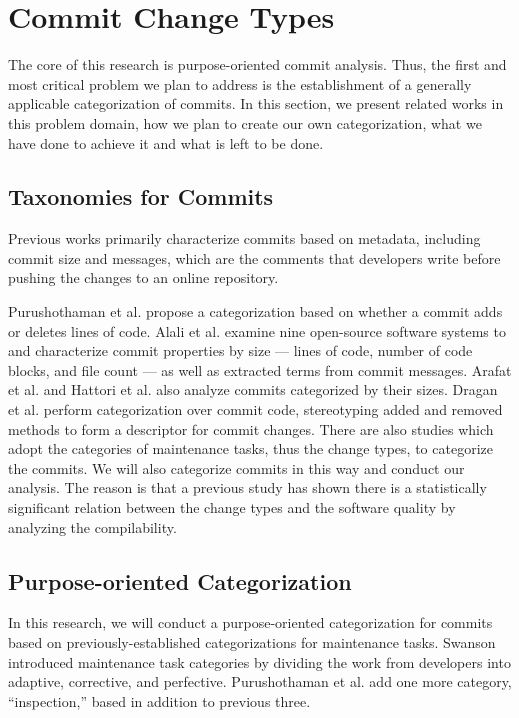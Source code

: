 \section{Commit Change Types}
\label{sec:type}

The core of this research is purpose-oriented commit analysis. Thus, the first and most critical problem we plan to address is the establishment of a generally applicable categorization of commits. 
In this section, we present related works in this problem domain, how we plan to create our own categorization, what we have done to achieve it and what is left to be done.

\subsection{Taxonomies for Commits}
Previous works primarily characterize commits based on metadata, including commit size and messages, which are the comments that developers write before pushing the changes to an online repository. 

Purushothaman et al. \cite{purushothaman2004towards} propose a categorization based on whether a commit adds or deletes lines of code.
Alali et al.\cite{alali_2008} examine nine open-source software systems to and characterize commit properties by size --- lines of code, number of code blocks, and file count --- as well as extracted terms from commit messages.
Arafat et al. \cite{arafat2009commit} and Hattori et al. \cite{hattori2008nature} also analyze commits categorized by their sizes. 
Dragan et al. \cite{Dragan} perform categorization over commit code, stereotyping added and removed methods to form a descriptor for commit changes.
There are also studies which adopt the categories of maintenance tasks, thus the change types, to categorize the commits. 
We will also categorize commits in this way and conduct our analysis.
The reason is that a previous study \cite{qrs2020} has shown there is a statistically significant relation between the change types and the software quality by analyzing the compilability.

\subsection{Purpose-oriented Categorization}
In this research, we will conduct a purpose-oriented categorization for commits based on previously-established categorizations for maintenance tasks.
Swanson \cite{Swanson} introduced maintenance task categories by dividing the work from developers into adaptive, corrective, and perfective.
Purushothaman et al. \cite{purushothaman2004towards} add one more category, ``inspection,'' based in addition to previous three.

